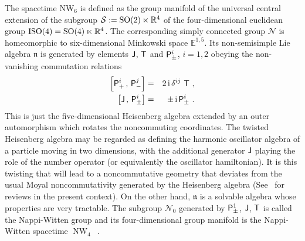 \documentclass[11pt,a4paper]{article}
\DeclareMathOperator{\NW}{NW}
\def\nn{\nonumber}
\newcommand{\1}{\mathbb{1}}
\def\ii{{\,{\rm i}\,}}
\def\P{{\sf P}}
\def\T{{\sf T}}
\def\J{{\sf J}}
\newcommand{\real}{{\mathbb R}} %
\newcommand{\eucl}{{\mathbb E}}
\def\nn{\nonumber}
\def\bea{\begin{eqnarray}}
\def\eea{\end{eqnarray}}
\begin{document}
The spacetime NW$_6$ is defined as the group manifold of
the universal central extension of the subgroup
$\mathcal{S}:={\rm SO}(2)\ltimes\real^4$ of the four-dimensional
euclidean group ${\rm ISO}(4)={\rm
  SO}(4)\ltimes\real^4$. The corresponding simply connected group
$\mathcal N$ is homeomorphic to six-dimensional Minkowski space
$\eucl^{1,5}$. Its non-semisimple Lie algebra $\mathfrak n$ is
generated by elements $\J$, $\T$ and $\P^i_\pm$, $i=1,2$ obeying the
non-vanishing commutation relations
\bea
\left[\P^i_+\,,\,\P^j_-\right]&=&2\ii\delta^{ij}~\T \ , \nn\\
\left[\J\,,\,\P^i_\pm\right]&=&\pm\ii\P^i_\pm \ .
\label{NW4algdef}\eea
This is just the five-dimensional Heisenberg algebra extended by an
outer automorphism which rotates the noncommuting coordinates. The
twisted Heisenberg algebra
may be regarded as defining the harmonic oscillator algebra of a
particle moving in two dimensions, with the additional generator $\J$
playing the role of the number operator (or equivalently the
oscillator hamiltonian). It is this twisting that will
lead to a noncommutative geometry that deviates from the usual Moyal
noncommutativity generated by the Heisenberg algebra
(See~\cite{KS1,DougNek1,Sz1} for reviews in the present context). On the other
hand, $\mathfrak{n}$ is a solvable algebra whose properties are very
tractable. The subgroup $\mathcal{N}_0$ generated by $\P^1_\pm$, $\J$,
$\T$ is called the Nappi-Witten group and its four-dimensional group
manifold is the Nappi-Witten spacetime $\NW_4$~\cite{NW1}.
\end{document}
